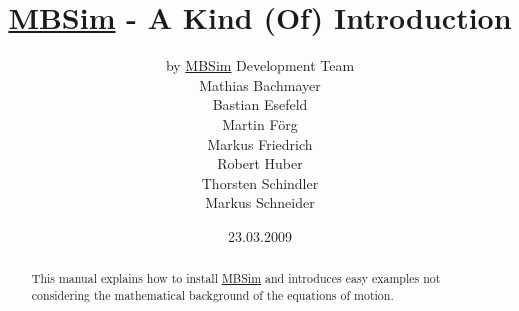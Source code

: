 \documentclass[a4,english]{AMpaper}
\newcommand{\MBSim}{\href{http://mbsim.berlios.de}{\textsf{MBSim}}}
\begin{document}
\title{\MBSim{} - A Kind (Of) Introduction}
\author{by \MBSim{} Development Team\\
  Mathias Bachmayer\\
  Bastian Esefeld\\
  Martin F\"org\\
  Markus Friedrich\\
  Robert Huber\\
  Thorsten Schindler\\
  Markus Schneider}
\date{23.03.2009}
\maketitle

\begin{abstract}
  This manual explains how to install \MBSim{} and introduces easy examples not considering the mathematical background of the equations of motion.
\end{abstract}

\noindent\hrulefill
\tableofcontents



%


%
%




\end{document}
